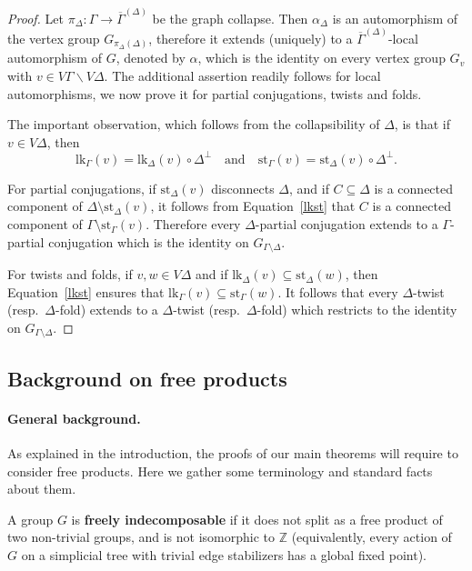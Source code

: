 \documentclass[a4paper,english,11pt]{article}
\theoremstyle{definition}
\theoremstyle{remark}
\newcommand{\st}{\mathrm{st}}
\newcommand{\lk}{\mathrm{lk}}
\newcommand{\deffont}[1]{\textbf{#1}}
\begin{document}
\begin{proof}
  Let $\pi_\Delta:\Gamma \rightarrow \overline{\Gamma}^{(\Delta)}$ be the graph collapse. Then $\alpha_\Delta$ is an automorphism of the vertex group $G_{\pi_\Delta(\Delta)}$, therefore it extends (uniquely) to a $ \overline{\Gamma}^{(\Delta)}$-local automorphism of $G$, denoted by $\alpha$, which is the identity on every vertex group $G_v$ with $v\in V\Gamma\backslash V\Delta$. The additional assertion readily follows for local automorphisms, we now prove it for partial conjugations, twists and folds. 

  The important observation, which follows from the collapsibility of $\Delta$, is that if $v\in V\Delta$, then
  \begin{equation}\label{lkst}
    \lk_\Gamma(v)=\lk_{\Delta}(v)\circ\Delta^{\perp} \quad \text{and} \quad \st_{\Gamma}(v)=\st_{\Delta}(v)\circ\Delta^{\perp}.
  \end{equation}

  For partial conjugations, if $\st_{\Delta}(v)$ disconnects $\Delta$, and if $C\subseteq \Delta$ is a connected component of $\Delta\setminus\st_{\Delta}(v)$, it follows from Equation~\eqref{lkst} that $C$ is a connected component of $\Gamma\setminus\st_{\Gamma}(v)$. Therefore every $\Delta$-partial conjugation extends to a $\Gamma$-partial conjugation which is the identity on $G_{\Gamma\setminus\Delta}$.

  For twists and folds, if $v,w\in V\Delta$ and if $\lk_{\Delta}(v)\subseteq\st_\Delta(w)$, then Equation~\eqref{lkst} ensures that $\lk_{\Gamma}(v)\subseteq\st_\Gamma(w)$. It follows that every $\Delta$-twist (resp.\ $\Delta$-fold) extends to a $\Delta$-twist (resp.\ $\Delta$-fold) which restricts to the identity on $G_{\Gamma\setminus\Delta}$. 
\end{proof}

\subsection{Background on free products}

\paragraph*{General background.} As explained in the introduction, the proofs of our main theorems will require to consider free products. Here we gather some terminology and standard facts about them. 

A group $G$ is \deffont{freely indecomposable} if it does not split as a free product of two non-trivial groups, and is not isomorphic to $\mathbb{Z}$ (equivalently, every action of $G$ on a simplicial tree with trivial edge stabilizers has a global fixed point). 
\end{document}
